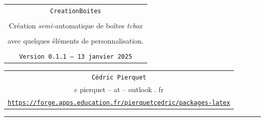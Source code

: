 \documentclass[french,11pt,a4paper]{article}
\def\TPversion{0.1.1}
\def\TPdate{13 janvier 2025}
\begin{document}
\pagestyle{fancy}

\thispagestyle{empty}

\begin{center}
	\begin{minipage}{0.88\linewidth}
	\begin{tcolorbox}[colframe=yellow,colback=yellow!15]
		\begin{center}
			\begin{tabular}{c}
				{\Huge \texttt{CreationBoites}}\\
				\\
				{\LARGE Création \textit{semi-}automatique de boîtes \textit{tcbox}} \\
				\\
				{\LARGE avec quelques éléments de personnalisation.} \\
				\\
				{\small \texttt{Version \TPversion{} -- \TPdate}}
		\end{tabular}
		\end{center}
	\end{tcolorbox}
\end{minipage}
\end{center}

\begin{center}
	\begin{tabular}{c}
	\texttt{Cédric Pierquet}\\
	{\ttfamily c pierquet -- at -- outlook . fr}\\
	\texttt{\url{https://forge.apps.education.fr/pierquetcedric/packages-latex}}
\end{tabular}
\end{center}

\hrule

\vfill
\end{document}
